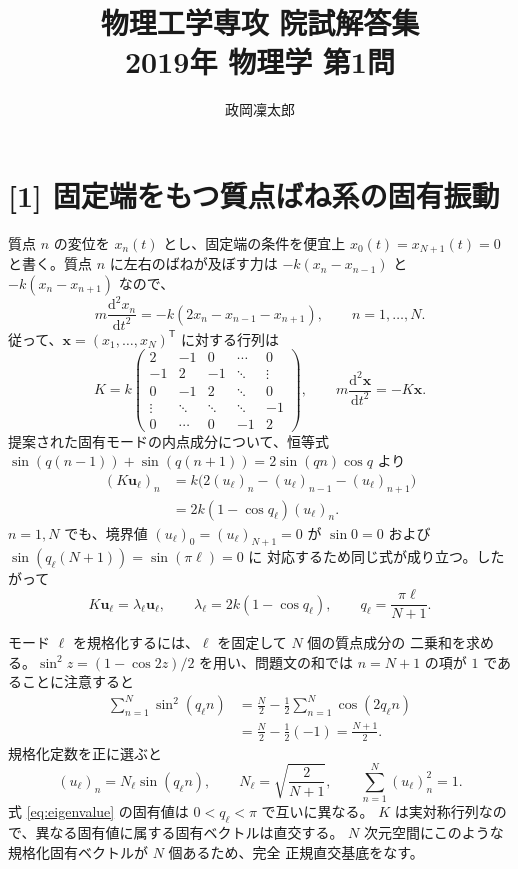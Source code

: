 \documentclass[11pt,a4paper]{article}
\title{物理工学専攻 院試解答集\\2019年 物理学 第1問}
\author{政岡凜太郎}
\date{}
\begin{document}
\maketitle

\section*{[1] 固定端をもつ質点ばね系の固有振動}
質点 $n$ の変位を $x_n(t)$ とし、固定端の条件を便宜上
$x_0(t)=x_{N+1}(t)=0$ と書く。質点 $n$ に左右のばねが及ぼす力は
$-k(x_n-x_{n-1})$ と $-k(x_n-x_{n+1})$ なので、
\begin{equation}
  m\frac{\mathrm{d}^2x_n}{\mathrm{d}t^2}
  =-k(2x_n-x_{n-1}-x_{n+1}),\qquad n=1,\ldots,N.
  \label{eq:motion-components}
\end{equation}
従って、$\boldsymbol{x}=(x_1,\ldots,x_N)^\mathsf{T}$ に対する行列は
\begin{equation}
 K=k\begin{pmatrix}
 2&-1&0&\cdots&0\\
 -1&2&-1&\ddots&\vdots\\
 0&-1&2&\ddots&0\\
 \vdots&\ddots&\ddots&\ddots&-1\\
 0&\cdots&0&-1&2
 \end{pmatrix},\qquad
 m\frac{\mathrm{d}^2\boldsymbol{x}}{\mathrm{d}t^2}=-K\boldsymbol{x}.
 \label{eq:K}
\end{equation}
提案された固有モードの内点成分について、恒等式
$\sin(q(n-1))+\sin(q(n+1))=2\sin(qn)\cos q$ より
\begin{align}
 (K\boldsymbol{u}_\ell)_n
 &=k\bigl(2(u_\ell)_n-(u_\ell)_{n-1}-(u_\ell)_{n+1}\bigr)\\
 &=2k(1-\cos q_\ell)(u_\ell)_n.
\end{align}
$n=1,N$ でも、境界値 $(u_\ell)_0=(u_\ell)_{N+1}=0$ が
$\sin 0=0$ および $\sin(q_\ell(N+1))=\sin(\pi\ell)=0$ に
対応するため同じ式が成り立つ。したがって
\begin{equation}
  K\boldsymbol{u}_\ell=\lambda_\ell\boldsymbol{u}_\ell,
  \qquad \lambda_\ell=2k(1-\cos q_\ell),
  \qquad q_\ell=\frac{\pi\ell}{N+1}.
  \label{eq:eigenvalue}
\end{equation}

モード $\ell$ を規格化するには、$\ell$ を固定して $N$ 個の質点成分の
二乗和を求める。$\sin^2 z=(1-\cos 2z)/2$ を用い、問題文の和では
$n=N+1$ の項が $1$ であることに注意すると
\begin{align}
 \sum_{n=1}^{N}\sin^2(q_\ell n)
 &=\frac{N}{2}-\frac12\sum_{n=1}^{N}\cos(2q_\ell n)\\
 &=\frac{N}{2}-\frac12(-1)=\frac{N+1}{2}.
\end{align}
規格化定数を正に選ぶと
\begin{equation}
  (u_\ell)_n=N_\ell\sin(q_\ell n),\qquad
  N_\ell=\sqrt{\frac{2}{N+1}},\qquad
  \sum_{n=1}^{N}(u_\ell)_n^2=1.
  \label{eq:normalization}
\end{equation}
式 \eqref{eq:eigenvalue} の固有値は $0<q_\ell<\pi$ で互いに異なる。
$K$ は実対称行列なので、異なる固有値に属する固有ベクトルは直交する。
$N$ 次元空間にこのような規格化固有ベクトルが $N$ 個あるため、完全
正規直交基底をなす。
\end{document}
